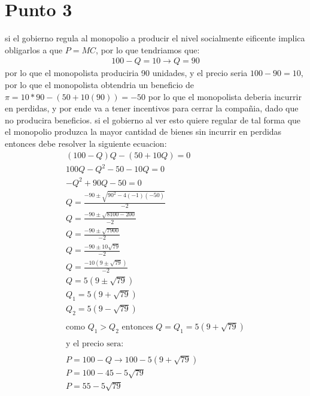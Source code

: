 \documentclass[11pt]{article}
\begin{document}
\section{Punto 3}
\begin{flushleft}
    si el gobierno regula al monopolio a producir el nivel socialmente eificente implica obligarlos a que $P=MC$, por lo que tendriamos que:
    \begin{align*}
        100-Q=10 \to Q=90
    \end{align*}
    por lo que el monopolista produciria 90 unidades, y el precio seria $100-90=10$, por lo que el monopolista
    obtendria un beneficio de $\pi=10*90-(50+10(90))=-50$ por lo que el monopolista deberia incurrir en perdidas, y por
    ende va a tener incentivos para cerrar la compañia, dado que no producira beneficios.
    si el gobierno al ver esto quiere regular de tal forma que el monopolio produzca la mayor
    cantidad de bienes sin incurrir en perdidas entonces debe resolver la siguiente ecuacion:
    \begin{align*}
        (100-Q)Q-(50+10Q)=0\\
        100Q-Q^2-50-10Q=0\\
        -Q^2+90Q-50=0\\
        Q=\frac{-90\pm\sqrt{90^2-4(-1)(-50)}}{-2}\\
        Q=\frac{-90\pm\sqrt{8100-200}}{-2}\\
        Q=\frac{-90\pm\sqrt{7900}}{-2}\\
        Q=\frac{-90\pm10\sqrt{79}}{-2}\\
        Q=\frac{-10(9\pm\sqrt{79})}{-2}\\
        Q=5(9\pm\sqrt{79})\\
        Q_1=5(9+\sqrt{79})\\
        Q_2=5(9-\sqrt{79})\\~\\
        \text{como } Q_1>Q_2 \text{ entonces } Q=Q_1=5(9+\sqrt{79})\\~\\
        \text{y el precio sera:}\\~\\
        P=100-Q \to 100-5(9+\sqrt{79}) \\
        P=100-45-5\sqrt{79}\\
        P=55-5\sqrt{79}\\
    \end{align*}
\end{flushleft}
\end{document}
